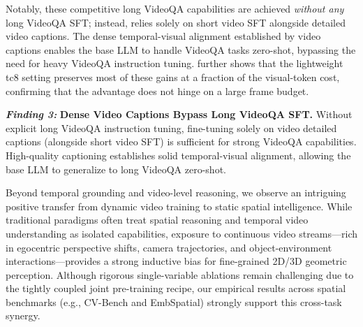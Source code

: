 Notably, these competitive long VideoQA capabilities are achieved \emph{without any} long VideoQA SFT; instead, \magevl relies solely on short video SFT alongside detailed video captions. The dense temporal-visual alignment established by video captions enables the base LLM to handle VideoQA tasks zero-shot, bypassing the need for heavy VideoQA instruction tuning.  further shows that the lightweight tc8 setting preserves most of these gains at a fraction of the visual-token cost, confirming that the advantage does not hinge on a large frame budget.


\begin{promptbox}
\large
\textbf{\textit{Finding 3:}}
\textbf{Dense Video Captions Bypass Long VideoQA SFT.}
Without explicit long VideoQA instruction tuning, fine-tuning solely on video detailed captions (alongside short video SFT) is sufficient for strong VideoQA capabilities. High-quality captioning establishes solid temporal-visual alignment, allowing the base LLM to generalize to long VideoQA zero-shot.
\end{promptbox}





Beyond temporal grounding and video-level reasoning, we observe an intriguing positive transfer from dynamic video training to static spatial intelligence. 
While traditional paradigms often treat spatial reasoning and temporal video understanding as isolated capabilities, exposure to continuous video streams—rich in egocentric perspective shifts, camera trajectories, and object-environment interactions—provides a strong inductive bias for fine-grained 2D/3D geometric perception. 
Although rigorous single-variable ablations remain challenging due to the tightly coupled joint pre-training recipe, our empirical results across spatial benchmarks (e.g., CV-Bench and EmbSpatial) strongly support this cross-task synergy.

